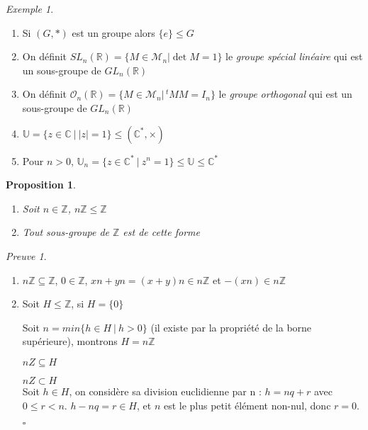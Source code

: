 \documentclass[]{article}
\newtheorem{myproposition}{Proposition}
\theoremstyle{remark}
\newtheorem{myproof}{Preuve}
\newtheorem{myexmpl}{Exemple}
\theoremstyle{definition}
\newcommand{\cqfd}{
	\hfill$\square$
}
\newenvironment{proofpart}[1]{
	\noindent
	{\boldmath #1}
}{
	\checkmark
}
\begin{document}
\begin{myexmpl}
	\begin{enumerate}
		\item Si $(G, *)$ est un groupe alors $\{e\} \leqslant G$
		\item On définit $SL_n(\mathbb{R})=\{M \in \mathcal{M}_n | \det M = 1\}$ le \textit{groupe spécial linéaire} qui est un sous-groupe de $GL_n(\mathbb{R})$
		\item On définit $\mathcal{O}_n(\mathbb{R})=\{M \in \mathcal{M}_n | \,^tMM = I_n\}$ le \textit{groupe orthogonal} qui est un sous-groupe de $GL_n(\mathbb{R})$
		\item $\mathbb{U} = \{z \in \mathbb{C} ~ | ~ |z| = 1\} \leqslant (\mathbb{C}^*, \times)$
		\item Pour $n > 0$, $\mathbb{U}_n = \{z \in \mathbb{C}^* ~ | ~ z^n = 1\} \leqslant \mathbb{U} \leqslant \mathbb{C}^*$
	\end{enumerate}
\end{myexmpl}

\begin{myproposition}
	\leavevmode
	\begin{enumerate}
		\item Soit $n \in \mathbb{Z}$, $n\mathbb{Z} \leqslant \mathbb{Z}$
		\item Tout sous-groupe de $\mathbb{Z}$ est de cette forme
	\end{enumerate}
\end{myproposition}

\begin{myproof}
	\leavevmode
	\begin{enumerate}
		\item $n\mathbb{Z} \subseteq \mathbb{Z}$, $0 \in \mathbb{Z}$, $xn + yn = (x+y)n \in n\mathbb{Z}$ et $-(xn) \in n\mathbb{Z}$
		\item Soit $H \leqslant \mathbb{Z}$, si $H = \{0\}$ \checkmark
		
		Soit $n = min\{h \in H ~|~ h > 0\}$ (il existe par la propriété de la borne supérieure), montrons $H = n\mathbb{Z}$

		\begin{proofpart}{$nZ \subseteq H$}
		\end{proofpart}

		\begin{proofpart}{$nZ \subset H$}\\			
			Soit $h \in H$, on considère sa division euclidienne par n : $h = nq + r$ avec $0 \leqslant r < n$.
			$h - nq = r\in H$, et $n$ est le plus petit élément non-nul, donc $r = 0$.
		\end{proofpart}
		
		\cqfd
	\end{enumerate}
\end{myproof}
\end{document}
